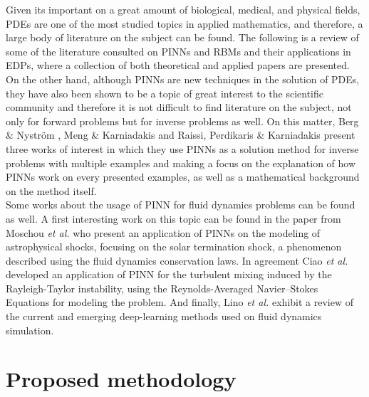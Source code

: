 \documentclass[12pt,letterpaper]{article}
\begin{document}
Given its important on a great amount of biological, medical, and physical fields, PDEs are one of the most studied topics in applied mathematics, and therefore, a large body of literature on the subject can be found. The following is a review of some of the literature consulted on PINNs and RBMs and their applications in EDPs, where a collection of both theoretical and applied papers are presented.\\

On the other hand, although PINNs are new techniques in the solution of PDEs, they have also been shown to be a topic of great interest to the scientific community and therefore it is not difficult to find literature on the subject, not only for forward problems but for inverse problems as well. On this matter, Berg \& Nyström \cite{berg2021neural} , Meng \& Karniadakis \cite{meng2020composite} and Raissi, Perdikaris \& Karniadakis \cite{raissi2019physics} present three works of interest in which they use PINNs as a solution method for inverse problems with multiple examples and making a focus on the explanation of how PINNs work on every presented examples, as well as a mathematical background on the method itself.\\

Some works about the usage of PINN for fluid dynamics problems can be found as well. A first interesting work on this topic can be found in the paper from Moschou \textit{et al.} \cite{moschou2023physics} who present an application of PINNs on the modeling of astrophysical shocks, focusing on the solar termination shock, a phenomenon described using the fluid dynamics conservation laws. In agreement Ciao \textit{et al.} \cite{xiao2023physics} developed an application of PINN for the turbulent mixing induced by the Rayleigh-Taylor instability, using the Reynolds-Averaged Navier–Stokes Equations for modeling the problem. And finally, Lino \textit{et al.} \cite{lino2023current} exhibit a review of the current and emerging deep-learning methods used on fluid dynamics simulation.

\section{Proposed methodology}

\end{document}
